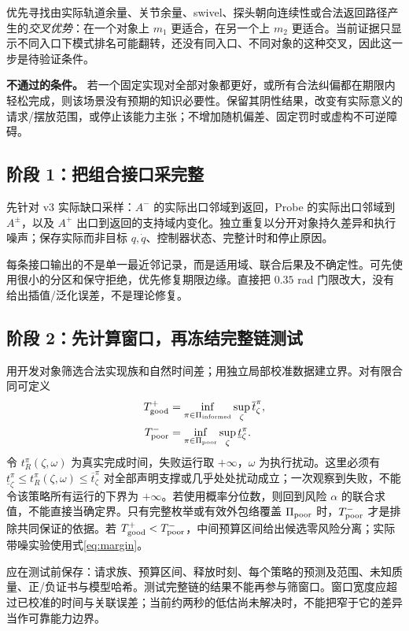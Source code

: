 \documentclass[11pt,a4paper,fontset=fandol]{ctexart}
\theoremstyle{definition}
\theoremstyle{remark}\newtheorem{remark}[theorem]{说明}
\numberwithin{equation}{section}
\begin{document}
优先寻找由实际轨道余量、关节余量、swivel、探头朝向连续性或合法返回路径产生的\emph{交叉优势}：在一个对象上 $m_1$ 更适合，在另一个上 $m_2$ 更适合。当前证据只显示不同入口下模式排名可能翻转，还没有同入口、不同对象的这种交叉，因此这一步是待验证条件。

\textbf{不通过的条件。} 若一个固定实现对全部对象都更好，或所有合法纠偏都在期限内轻松完成，则该场景没有预期的知识必要性。保留其阴性结果，改变有实际意义的请求/摆放范围，或停止该能力主张；不增加随机偏差、固定罚时或虚构不可逆障碍。

\subsection{阶段 1：把组合接口采完整}
先针对 v3 实际缺口采样：$A^-$ 的实际出口邻域到返回，Probe 的实际出口邻域到 $A^\pm$，以及 $A^+$ 出口到返回的支持域内变化。独立重复以分开对象持久差异和执行噪声；保存实际而非目标 $q,\dot q$、控制器状态、完整计时和停止原因。

每条接口输出的不是单一最近邻记录，而是适用域、联合后果及不确定性。可先使用很小的分区和保守拒绝，优先修复期限边缘。直接把 $0.35$ rad 门限改大，没有给出插值/泛化误差，不是理论修复。

\subsection{阶段 2：先计算窗口，再冻结完整链测试}
用开发对象筛选合法实现族和自然时间差；用独立局部校准数据建立界。对有限合同可定义
\begin{align}
 T_{\rm good}^+&=\inf_{\pi\in\Pi_{\rm informed}}
 \sup_\zeta\overline t_\zeta^\pi,\\
 T_{\rm poor}^-&=\inf_{\pi\in\Pi_{\rm poor}}
 \sup_\zeta\underline t_\zeta^\pi.
 \label{eq:window}
\end{align}
令 $t_R^\pi(\zeta,\omega)$ 为真实完成时间，失败运行取 $+\infty$，$\omega$ 为执行扰动。这里必须有 $\underline t_\zeta^\pi\le t_R^\pi(\zeta,\omega)\le\overline t_\zeta^\pi$ 对全部声明支撑或几乎处处扰动成立；一次观察到失败，不能令该策略所有运行的下界为 $+\infty$。若使用概率分位数，则回到风险 $\alpha$ 的联合求值，不能直接当确定界。只有完整枚举或有效外包络覆盖 $\Pi_{\rm poor}$ 时，$T_{\rm poor}^-$ 才是排除共同保证的依据。若 $T_{\rm good}^+<T_{\rm poor}^-$，中间预算区间给出候选零风险分离；实际带噪实验使用式\eqref{eq:margin}。

应在测试前保存：请求族、预算区间、释放时刻、每个策略的预测及范围、未知质量、正/负证书与模型哈希。测试完整链的结果不能再参与筛窗口。窗口宽度应超过已校准的时间与关联误差；当前约两秒的低估尚未解决时，不能把窄于它的差异当作可靠能力边界。
\end{document}
